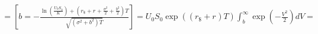 \documentclass[12pt, a4paper]{article}
\begin{document}
\begin{enumerate}
\[\begin{matrix}
\begin{matrix}
\begin{matrix}
\begin{matrix}
\begin{matrix}
\begin{matrix}
\begin{matrix}
\begin{matrix}
\begin{matrix}
 = \left\lbrack b = - \frac{\ln\left( \frac{{U_{0}S}_{0}}{K} \right) + \left( r_{\$} + r_{} + \frac{\sigma^{2}}{2} + \frac{b^{2}}{2} \right)T}{\sqrt{\left( \sigma^{2} + b^{2} \right)T}} \right\rbrack = U_{0}S_{0}\exp\left( \left( r_{\$} + r_{} \right)T \right)\int_{b}^{\infty}{\exp\left( - \frac{V^{2}}{2} \right)}dV = \\
\end{matrix} \\
\end{matrix} \\
\end{matrix} \\
\end{matrix} \\
\end{matrix} \\
\end{matrix} \\
\end{matrix} \\
\end{matrix} \\
\end{matrix}\]


\end{enumerate}
\end{document}
